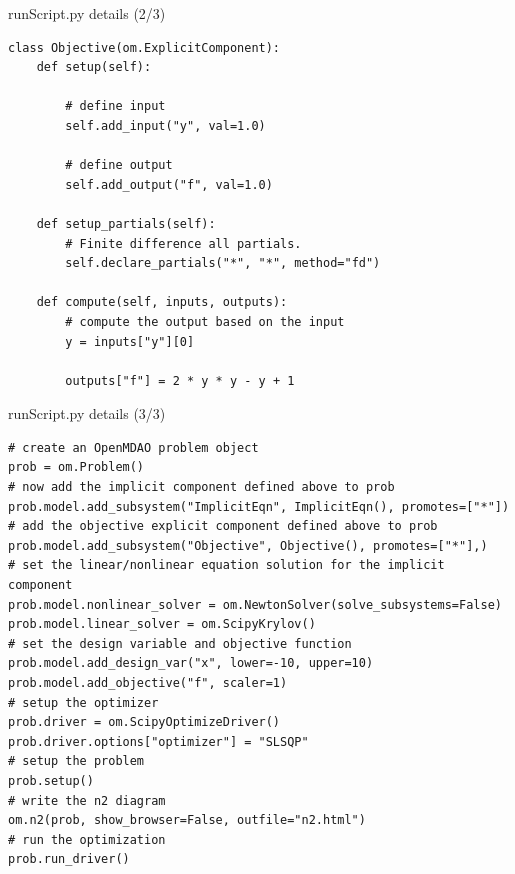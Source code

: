 \documentclass{bredelebeamer}
\begin{document}
\begin{frame}[fragile]{runScript.py details (2/3)}
  \footnotesize
  \lstset{ language=python }
  \begin{lstlisting}
class Objective(om.ExplicitComponent):
    def setup(self):

        # define input
        self.add_input("y", val=1.0)

        # define output
        self.add_output("f", val=1.0)

    def setup_partials(self):
        # Finite difference all partials.
        self.declare_partials("*", "*", method="fd")

    def compute(self, inputs, outputs):
        # compute the output based on the input
        y = inputs["y"][0]

        outputs["f"] = 2 * y * y - y + 1
  \end{lstlisting}
  \normalsize
\end{frame}


\begin{frame}[fragile]{runScript.py details (3/3)}
  \footnotesize
  \lstset{ language=python }
  \begin{lstlisting}
# create an OpenMDAO problem object
prob = om.Problem()
# now add the implicit component defined above to prob
prob.model.add_subsystem("ImplicitEqn", ImplicitEqn(), promotes=["*"])
# add the objective explicit component defined above to prob
prob.model.add_subsystem("Objective", Objective(), promotes=["*"],)
# set the linear/nonlinear equation solution for the implicit component
prob.model.nonlinear_solver = om.NewtonSolver(solve_subsystems=False)
prob.model.linear_solver = om.ScipyKrylov()
# set the design variable and objective function
prob.model.add_design_var("x", lower=-10, upper=10)
prob.model.add_objective("f", scaler=1)
# setup the optimizer
prob.driver = om.ScipyOptimizeDriver()
prob.driver.options["optimizer"] = "SLSQP"
# setup the problem
prob.setup()
# write the n2 diagram
om.n2(prob, show_browser=False, outfile="n2.html")
# run the optimization
prob.run_driver()
  \end{lstlisting}
  \normalsize
\end{frame}
\end{document}
